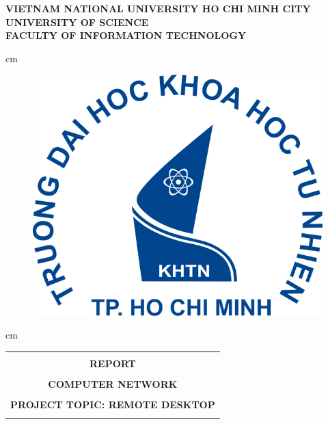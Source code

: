 \documentclass[oneside,a4paper,14pt]{extreport}
\author{Trần Ngọc Đại}
\begin{document}
	\fancyhf{}
	\rhead{}
	\pagestyle{fancy}
	\renewcommand{\headrulewidth}{1pt}
	\renewcommand{\footrulewidth}{1pt}
	\begin{titlepage}
		\begin{mybox}
			\begin{center}
				\fontsize{12}{12}\selectfont
				\textbf{VIETNAM NATIONAL UNIVERSITY HO CHI MINH CITY}\\
				\textbf{UNIVERSITY OF SCIENCE}\\
				\textbf{FACULTY OF INFORMATION TECHNOLOGY}
			\end{center}
			 cm
			\begin{figure}[H]
				\begin{center}
					\includegraphics[scale=0.25]{img/logo}
				\end{center}
			\end{figure}
			 cm
			\begin{center}
				
				\begin{tabular}{c}
					\hline\\
					\fontsize{40}{14}\selectfont
					\textbf{REPORT}\\\\
					\fontsize{18}{0}\selectfont
					\textbf{COMPUTER NETWORK}\\\\
					
					\fontsize{16}{12}\selectfont
					\textbf{PROJECT TOPIC: REMOTE DESKTOP}\\\\
					\hline
				\end{tabular}
				

\end{center}
\end{mybox}
\end{titlepage}
\end{document}

